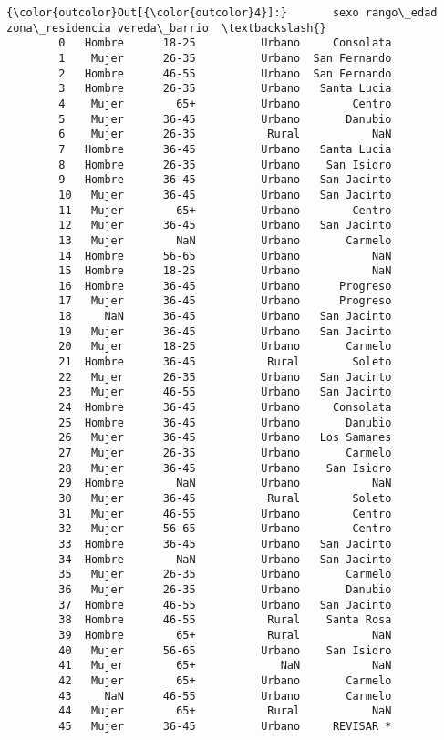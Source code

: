 \documentclass[11pt]{article}
\begin{document}
\begin{Verbatim}[commandchars=\\\{\}]
{\color{outcolor}Out[{\color{outcolor}4}]:}       sexo rango\_edad zona\_residencia vereda\_barrio  \textbackslash{}
        0   Hombre      18-25          Urbano     Consolata   
        1    Mujer      26-35          Urbano  San Fernando   
        2   Hombre      46-55          Urbano  San Fernando   
        3   Hombre      26-35          Urbano   Santa Lucia   
        4    Mujer        65+          Urbano        Centro   
        5    Mujer      36-45          Urbano       Danubio   
        6    Mujer      26-35           Rural           NaN   
        7   Hombre      36-45          Urbano   Santa Lucia   
        8   Hombre      26-35          Urbano    San Isidro   
        9   Hombre      36-45          Urbano   San Jacinto   
        10   Mujer      36-45          Urbano   San Jacinto   
        11   Mujer        65+          Urbano        Centro   
        12   Mujer      36-45          Urbano   San Jacinto   
        13   Mujer        NaN          Urbano       Carmelo   
        14  Hombre      56-65          Urbano           NaN   
        15  Hombre      18-25          Urbano           NaN   
        16  Hombre      36-45          Urbano      Progreso   
        17   Mujer      36-45          Urbano      Progreso   
        18     NaN      36-45          Urbano   San Jacinto   
        19   Mujer      36-45          Urbano   San Jacinto   
        20   Mujer      18-25          Urbano       Carmelo   
        21  Hombre      36-45           Rural        Soleto   
        22   Mujer      26-35          Urbano   San Jacinto   
        23   Mujer      46-55          Urbano   San Jacinto   
        24  Hombre      36-45          Urbano     Consolata   
        25  Hombre      36-45          Urbano       Danubio   
        26   Mujer      36-45          Urbano   Los Samanes   
        27   Mujer      26-35          Urbano       Carmelo   
        28   Mujer      36-45          Urbano    San Isidro   
        29  Hombre        NaN          Urbano           NaN   
        30   Mujer      36-45           Rural        Soleto   
        31   Mujer      46-55          Urbano        Centro   
        32   Mujer      56-65          Urbano        Centro   
        33  Hombre      36-45          Urbano   San Jacinto   
        34  Hombre        NaN          Urbano   San Jacinto   
        35   Mujer      26-35          Urbano       Carmelo   
        36   Mujer      26-35          Urbano       Danubio   
        37  Hombre      46-55          Urbano   San Jacinto   
        38  Hombre      46-55           Rural    Santa Rosa   
        39  Hombre        65+           Rural           NaN   
        40   Mujer      56-65          Urbano    San Isidro   
        41   Mujer        65+             NaN           NaN   
        42   Mujer        65+          Urbano       Carmelo   
        43     NaN      46-55          Urbano       Carmelo   
        44   Mujer        65+           Rural           NaN   
        45   Mujer      36-45          Urbano     REVISAR *   
        

\end{Verbatim}
\end{document}
